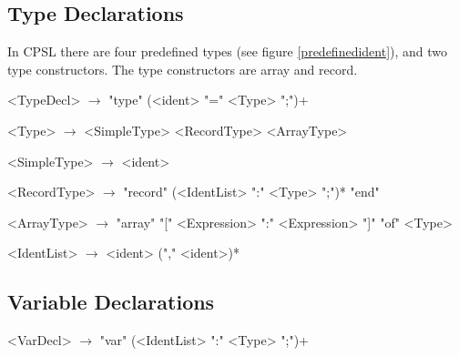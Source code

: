\documentclass{book}
\begin{document}
\subsection{Type Declarations}

In CPSL there are four predefined types (see figure \ref{predefinedident}), and two type constructors.
The type constructors are array and record.

\begin{grammar}
<TypeDecl> $\rightarrow$ "type" (<ident> "=" <Type> ";")+

<Type> $\rightarrow$ <SimpleType> \alt <RecordType> \alt <ArrayType>

<SimpleType> $\rightarrow$ <ident>

<RecordType> $\rightarrow$ "record" (<IdentList> ":" <Type> ";")* "end"

<ArrayType> $\rightarrow$ "array" "[" <Expression> ":" <Expression> "]" "of" <Type>

<IdentList> $\rightarrow$ <ident> ("," <ident>)*
\end{grammar}

\subsection{Variable Declarations}
\begin{grammar}
<VarDecl> $\rightarrow$ "var" (<IdentList> ":" <Type> ";")+
\end{grammar}
\end{document}
